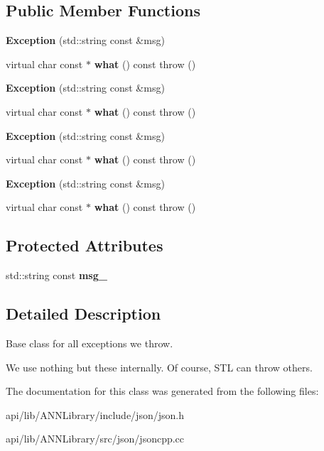 \subsection*{Public Member Functions}
\begin{DoxyCompactItemize}
\item 
{\bfseries Exception} (std\+::string const \&msg)\label{class_json_1_1_exception_a4dd1b9f007bed842e3ef9883d965fe22}

\item 
virtual char const $\ast$ {\bfseries what} () const   throw ()\label{class_json_1_1_exception_a93032b715e86fc37ad318c60eac4cad7}

\item 
{\bfseries Exception} (std\+::string const \&msg)\label{class_json_1_1_exception_a4dd1b9f007bed842e3ef9883d965fe22}

\item 
virtual char const $\ast$ {\bfseries what} () const   throw ()\label{class_json_1_1_exception_a49708f583127d4190f9e3806ac8e8eff}

\item 
{\bfseries Exception} (std\+::string const \&msg)\label{class_json_1_1_exception_a4dd1b9f007bed842e3ef9883d965fe22}

\item 
virtual char const $\ast$ {\bfseries what} () const   throw ()\label{class_json_1_1_exception_a49708f583127d4190f9e3806ac8e8eff}

\item 
{\bfseries Exception} (std\+::string const \&msg)\label{class_json_1_1_exception_a4dd1b9f007bed842e3ef9883d965fe22}

\item 
virtual char const $\ast$ {\bfseries what} () const   throw ()\label{class_json_1_1_exception_a49708f583127d4190f9e3806ac8e8eff}

\end{DoxyCompactItemize}
\subsection*{Protected Attributes}
\begin{DoxyCompactItemize}
\item 
std\+::string const {\bfseries msg\+\_\+}\label{class_json_1_1_exception_a6457bfa979e1bba636ba34605203f6a0}

\end{DoxyCompactItemize}


\subsection{Detailed Description}
Base class for all exceptions we throw.

We use nothing but these internally. Of course, S\+T\+L can throw others. 

The documentation for this class was generated from the following files\+:\begin{DoxyCompactItemize}
\item 
api/lib/\+A\+N\+N\+Library/include/json/json.\+h\item 
api/lib/\+A\+N\+N\+Library/src/json/jsoncpp.\+cc\end{DoxyCompactItemize}
